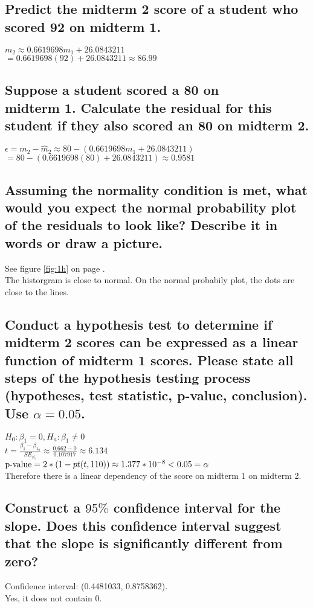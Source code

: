 \begin{multicols}{2}
        \subsection{Predict the midterm 2 score of a student who scored 92 on midterm 1.}
            $m_2 \approx 0.6619698m_1 + 26.0843211$\\
            $= 0.6619698(92) + 26.0843211 \approx 86.99$

        \subsection{Suppose a student scored a 80 on\\
            midterm 1. Calculate the residual for this student if
            they also scored an 80 on midterm 2.}
            $\epsilon = m_2 - \hat m_2 \approx 80 - (0.6619698m_1 + 26.0843211)$\\
            $= 80 - (0.6619698(80) + 26.0843211) \approx 0.9581$

        \subsection{Assuming the normality condition is met, what would you expect the normal
            probability plot of the residuals to look like? Describe it in words or draw a picture.}
            See figure \ref{fig:1h} on page \pageref{fig:1h}.\\
            The historgram is close to normal. 
            On the normal probabily plot, the dots are close to the lines.

        \subsection{Conduct a hypothesis test to determine if midterm 2 scores can be expressed as a linear
            function of midterm 1 scores. Please state all steps of the hypothesis testing process
            (hypotheses, test statistic, p-value, conclusion). Use $\alpha = 0.05$.}
            $H_0: \beta_1 = 0, H_a: \beta_1 \neq 0$\\
            $t = \frac{\beta_1 - \beta_{1_0}}{SE_{\beta_1}} 
            \approx \frac{0.662 - 0}{0.107917} \approx 6.134$\\
            $\text{p-value} = 2 * (1 - pt(t, 110)) \approx 1.377 * 10^{-8} < 0.05 = \alpha$\\
            Therefore there is a linear dependency of the score on midterm 1
            on midterm 2.

        \subsection{Construct a $95\%$ confidence interval for the slope. Does this confidence interval suggest
            that the slope is significantly different from zero?}
            Confidence interval: (0.4481033, 0.8758362). \\
            Yes, it does not contain 0.
    \end{multicols}